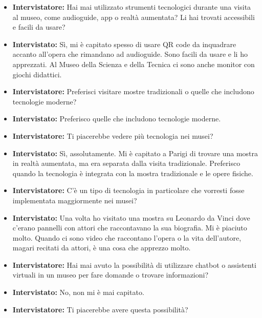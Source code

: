 \documentclass{article}
\begin{document}
\begin{itemize}
    \item \textbf{Intervistatore:} Hai mai utilizzato strumenti tecnologici durante una visita al museo, come audioguide, app o realtà aumentata? Li hai trovati accessibili e facili da usare?

    \item \textbf{Intervistato:} Sì, mi è capitato spesso di usare QR code da inquadrare accanto all’opera che rimandano ad audioguide. Sono facili da usare e li ho apprezzati. Al Museo della Scienza e della Tecnica ci sono anche monitor con giochi didattici.

    \item \textbf{Intervistatore:} Preferisci visitare mostre tradizionali o quelle che includono tecnologie moderne?

    \item \textbf{Intervistato:} Preferisco quelle che includono tecnologie moderne.

    \item \textbf{Intervistatore:} Ti piacerebbe vedere più tecnologia nei musei?

    \item \textbf{Intervistato:} Sì, assolutamente. Mi è capitato a Parigi di trovare una mostra in realtà aumentata, ma era separata dalla visita tradizionale. Preferisco quando la tecnologia è integrata con la mostra tradizionale e le opere fisiche.

    \item \textbf{Intervistatore:} C’è un tipo di tecnologia in particolare che vorresti fosse implementata maggiormente nei musei?

    \item \textbf{Intervistato:} Una volta ho visitato una mostra su Leonardo da Vinci dove c’erano pannelli con attori che raccontavano la sua biografia. Mi è piaciuto molto. Quando ci sono video che raccontano l’opera o la vita dell’autore, magari recitati da attori, è una cosa che apprezzo molto.

    \item \textbf{Intervistatore:} Hai mai avuto la possibilità di utilizzare chatbot o assistenti virtuali in un museo per fare domande o trovare informazioni?

    \item \textbf{Intervistato:} No, non mi è mai capitato.

    \item \textbf{Intervistatore:} Ti piacerebbe avere questa possibilità?


\end{itemize}
\end{document}
